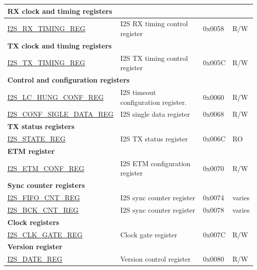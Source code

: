 \begin{longtable}{ | p{5.5cm} | p{7cm} | p{1.3cm} | p{2cm} | }
\multicolumn{4}{|l|}{\textbf{RX clock and timing registers}} \\ \hline
\hyperref[regdesc:I2SRXTIMINGREG]{I2S\_RX\_TIMING\_REG} & I2S RX timing control register & 0x0058 & R/W \\ \hline
\multicolumn{4}{|l|}{\textbf{TX clock and timing registers}} \\ \hline
\hyperref[regdesc:I2STXTIMINGREG]{I2S\_TX\_TIMING\_REG} & I2S TX timing control register & 0x005C & R/W \\ \hline
\multicolumn{4}{|l|}{\textbf{Control and configuration registers}} \\ \hline
\hyperref[regdesc:I2SLCHUNGCONFREG]{I2S\_LC\_HUNG\_CONF\_REG} & I2S timeout configuration register. & 0x0060 & R/W \\ \hline
\hyperref[regdesc:I2SCONFSIGLEDATAREG]{I2S\_CONF\_SIGLE\_DATA\_REG} & I2S single data register & 0x0068 & R/W \\ \hline
\multicolumn{4}{|l|}{\textbf{TX status registers}} \\ \hline
\hyperref[regdesc:I2SSTATEREG]{I2S\_STATE\_REG} & I2S TX status register & 0x006C & RO \\ \hline
\multicolumn{4}{|l|}{\textbf{ETM register}} \\ \hline
\hyperref[regdesc:I2SETMCONFREG]{I2S\_ETM\_CONF\_REG} & I2S ETM configuration register & 0x0070 & R/W \\ \hline
\multicolumn{4}{|l|}{\textbf{Sync counter registers}} \\ \hline
\hyperref[regdesc:I2SFIFOCNTREG]{I2S\_FIFO\_CNT\_REG} & I2S sync counter register & 0x0074 & varies \\ \hline
\hyperref[regdesc:I2SBCKCNTREG]{I2S\_BCK\_CNT\_REG} & I2S sync counter register & 0x0078 & varies \\ \hline
\multicolumn{4}{|l|}{\textbf{Clock registers}} \\ \hline
\hyperref[regdesc:I2SCLKGATEREG]{I2S\_CLK\_GATE\_REG} & Clock gate register & 0x007C & R/W \\ \hline
\multicolumn{4}{|l|}{\textbf{Version register}} \\ \hline
\hyperref[regdesc:I2SDATEREG]{I2S\_DATE\_REG} & Version control register & 0x0080 & R/W \\ \hline
\end{longtable}
